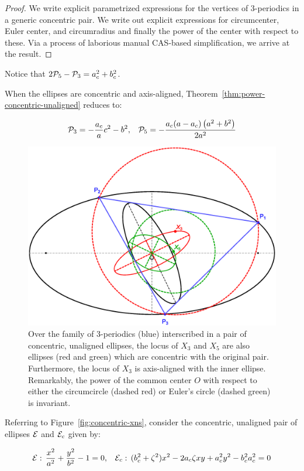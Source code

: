 \begin{proof}
We write explicit parametrized expressions for the vertices of 3-periodics in a generic concentric pair. We write out explicit expressions for circumcenter, Euler center, and circumradius and finally the power of the center with respect to these. Via a process of laborious manual CAS-based simplification, we arrive at the result.
\end{proof}

\noindent Notice that $2\P_5-\P_3=a_c^2+b_c^2$.

\begin{observation}
When the ellipses are concentric and axis-aligned, Theorem~\ref{thm:power-concentric-unaligned} reduces to:

\[ \P_3  = -\frac{a_c}{a}c^2 - b^2,\;\;\;\P_5 =-\frac{{a_c} (a-{a_c}) \left(a^2+b^2\right)}{2 a^2}\]
\end{observation}

\begin{figure}
    \centering
    \includegraphics[width=.7\textwidth]{pics/0030_n3_circum_euler.eps}
    \caption{Over the family of 3-periodics (blue) interscribed in a pair of concentric, unaligned ellipses, the locus of $X_3$ and $X_5$ are also ellipses (red and green) which are concentric with the original pair. Furthermore, the locus of $X_3$ is axis-aligned with the inner ellipse. Remarkably, the power of the common center $O$ with respect to either the circumcircle (dashed red) or Euler's circle (dashed green) is invariant.}
    \label{fig:n3-tilted-circum-euler}
\end{figure}

Referring to Figure~\ref{fig:concentric-xns}, consider the concentric, unaligned pair of ellipses $\E$ and $\E_c$ given by:

\[ 
    \E:\,\frac{x^2}{a^2}+\frac{y^2}{b^2}-1=0,\;\;\;
    \E_c:\,(b_c^2 + \zeta^2)x^2  - 2 a_c \zeta x y  + a_c^2 y^2 - b_c^2 a_c^2=0\\
\]

